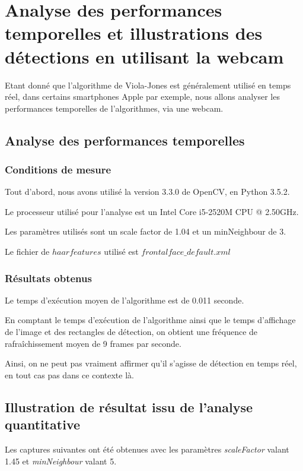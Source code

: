 \documentclass[a4paper,11pt]{article}
\begin{document}
	

\section{Analyse des performances temporelles et illustrations des détections en utilisant la webcam}

Etant donné que l'algorithme de Viola-Jones est généralement utilisé en temps réel, dans certains smartphones Apple par exemple, nous allons analyser les performances temporelles de l'algorithmes, via une webcam.

\subsection{Analyse des performances temporelles}
\subsubsection{Conditions de mesure}

Tout d'abord, nous avons utilisé la version 3.3.0 de OpenCV, en Python 3.5.2.

Le processeur utilisé pour l'analyse est un Intel Core i5-2520M CPU @ 2.50GHz.

Les paramètres utilisés sont un scale factor de 1.04 et un minNeighbour de 3.

Le fichier de $haar features$ utilisé est $frontalface\_default.xml$

\subsubsection{Résultats obtenus}

Le temps d'exécution moyen de l'algorithme est de 0.011 seconde.

En comptant le temps d'exécution de l'algorithme ainsi que le temps d'affichage de l'image et des rectangles de détection, on obtient une fréquence de rafraîchissement moyen de 9 frames par seconde.

Ainsi, on ne peut pas vraiment affirmer qu'il s'agisse de détection en temps réel, en tout cas pas dans ce contexte là.

\subsection{Illustration de résultat issu de l'analyse quantitative}

Les captures suivantes ont été obtenues avec les paramètres \textit{scaleFactor} valant 1.45 et \textit{minNeighbour} valant 5.
\end{document}
